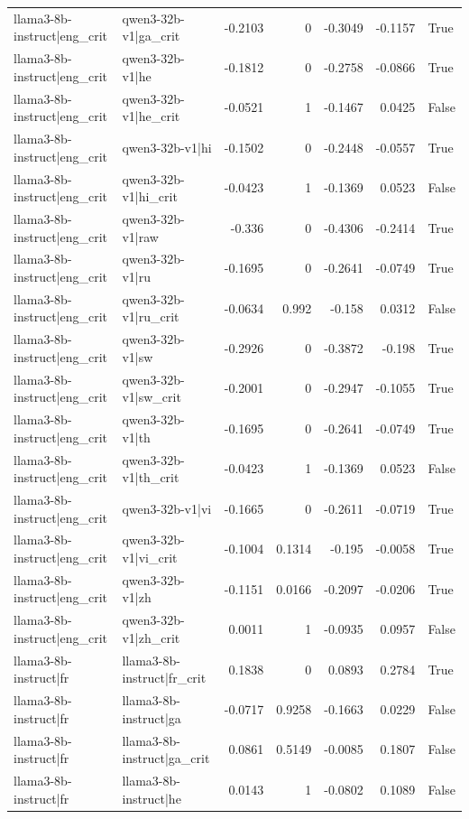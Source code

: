 \begin{table}
\begin{tabular}{l l r r r r l}
llama3-8b-instruct|eng_crit & qwen3-32b-v1|ga_crit & -0.2103 & 0 & -0.3049 & -0.1157 & True \\
llama3-8b-instruct|eng_crit & qwen3-32b-v1|he & -0.1812 & 0 & -0.2758 & -0.0866 & True \\
llama3-8b-instruct|eng_crit & qwen3-32b-v1|he_crit & -0.0521 & 1 & -0.1467 & 0.0425 & False \\
llama3-8b-instruct|eng_crit & qwen3-32b-v1|hi & -0.1502 & 0 & -0.2448 & -0.0557 & True \\
llama3-8b-instruct|eng_crit & qwen3-32b-v1|hi_crit & -0.0423 & 1 & -0.1369 & 0.0523 & False \\
llama3-8b-instruct|eng_crit & qwen3-32b-v1|raw & -0.336 & 0 & -0.4306 & -0.2414 & True \\
llama3-8b-instruct|eng_crit & qwen3-32b-v1|ru & -0.1695 & 0 & -0.2641 & -0.0749 & True \\
llama3-8b-instruct|eng_crit & qwen3-32b-v1|ru_crit & -0.0634 & 0.992 & -0.158 & 0.0312 & False \\
llama3-8b-instruct|eng_crit & qwen3-32b-v1|sw & -0.2926 & 0 & -0.3872 & -0.198 & True \\
llama3-8b-instruct|eng_crit & qwen3-32b-v1|sw_crit & -0.2001 & 0 & -0.2947 & -0.1055 & True \\
llama3-8b-instruct|eng_crit & qwen3-32b-v1|th & -0.1695 & 0 & -0.2641 & -0.0749 & True \\
llama3-8b-instruct|eng_crit & qwen3-32b-v1|th_crit & -0.0423 & 1 & -0.1369 & 0.0523 & False \\
llama3-8b-instruct|eng_crit & qwen3-32b-v1|vi & -0.1665 & 0 & -0.2611 & -0.0719 & True \\
llama3-8b-instruct|eng_crit & qwen3-32b-v1|vi_crit & -0.1004 & 0.1314 & -0.195 & -0.0058 & True \\
llama3-8b-instruct|eng_crit & qwen3-32b-v1|zh & -0.1151 & 0.0166 & -0.2097 & -0.0206 & True \\
llama3-8b-instruct|eng_crit & qwen3-32b-v1|zh_crit & 0.0011 & 1 & -0.0935 & 0.0957 & False \\
llama3-8b-instruct|fr & llama3-8b-instruct|fr_crit & 0.1838 & 0 & 0.0893 & 0.2784 & True \\
llama3-8b-instruct|fr & llama3-8b-instruct|ga & -0.0717 & 0.9258 & -0.1663 & 0.0229 & False \\
llama3-8b-instruct|fr & llama3-8b-instruct|ga_crit & 0.0861 & 0.5149 & -0.0085 & 0.1807 & False \\
llama3-8b-instruct|fr & llama3-8b-instruct|he & 0.0143 & 1 & -0.0802 & 0.1089 & False \\

\end{tabular}
\end{table}
